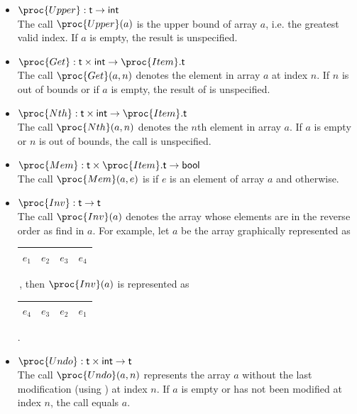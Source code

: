 \documentclass[11pt,a4paper]{article}
\newcommand\type[1]{\textsf{#1}}
\begin{document}
\begin{itemize}
\begin{itemize}
    \item \(\proc{Upper} : \type{t} \rightarrow \type{int}\)\\
    The call \(\proc{Upper} (a)\) is the upper bound of array
    \(a\), i.e. the greatest valid index. If \(a\) is empty, the
    result is unspecified.

    \item \(\proc{Get} : \type{t} \times \type{int} \rightarrow
    \proc{Item}.\type{t}\)\\
    The call \(\proc{Get} (a, n)\) denotes the element in
    array \(a\) at index \(n\). If \(n\) is out of bounds or if
    \(a\) is empty, the result of  is unspecified.

    \item \(\proc{Nth} : \type{t} \times \type{int} \rightarrow
      \proc{Item}.\type{t}\)\\ The call \(\proc{Nth}(a,n)\) denotes
      the \(n\)th element in array \(a\). If \(a\) is empty or \(n\)
      is out of bounds, the call is unspecified.

    \item \(\proc{Mem} : \type{t} \times \proc{Item}.\type{t}
    \rightarrow \type{bool}\)\\
    The call \(\proc{Mem}(a,e)\) is  if \(e\) is an element
    of array \(a\) and  otherwise.

    \item \(\proc{Inv} : \type{t} \rightarrow \type{t}\)\\
    The call \(\proc{Inv} (a)\) denotes the array whose elements are
    in the reverse order as find in \(a\). For example, let \(a\) be
    the array graphically represented as
    \begin{tabular}{|c|c|c|c|}\hline\(e_1\) & \(e_2\) &
    \(e_3\) & \(e_4\)\\\hline\end{tabular}\,, then \(\proc{Inv}(a)\) is
    represented as \begin{tabular}{|c|c|c|c|}\hline\(e_4\) & \(e_3\)
    & \(e_2\) & \(e_1\)\\\hline\end{tabular}.

    \item \(\proc{Undo} : \type{t} \times \type{int} \rightarrow
    \type{t}\)\\
    The call \(\proc{Undo}(a,n)\) represents the array \(a\) without
    the last modification (using ) at index \(n\). If \(a\)
    is empty or has not been modified at index \(n\), the call equals
    \(a\).

  \end{itemize}

\end{itemize}


\end{document}
